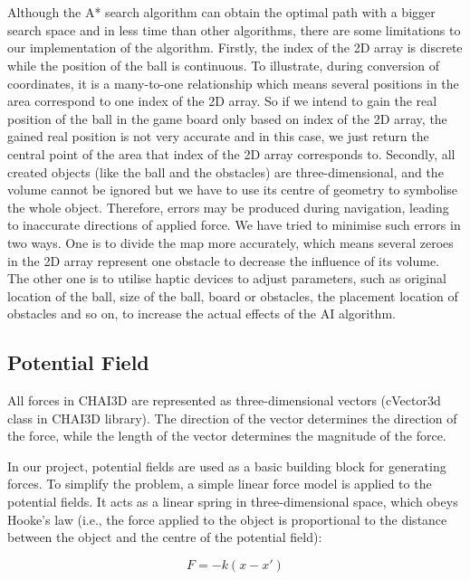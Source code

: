 \documentclass[a4paper]{article}
\begin{document}
 \\ \\
Although the A* search algorithm can obtain the optimal path with a bigger search space and in less time than other algorithms, there are some limitations to our implementation of the algorithm. Firstly, the index of the 2D array is discrete while the position of the ball is continuous. To illustrate, during conversion of coordinates, it is a many-to-one relationship which means several positions in the area correspond to one index of the 2D array. So if we intend to gain the real position of the ball in the game board only based on index of the 2D array, the gained real position is not very accurate and in this case, we just return the central point of the area that index of the 2D array corresponds to. Secondly, all created objects (like the ball and the obstacles) are three-dimensional, and the volume cannot be ignored but we have to use its centre of geometry to symbolise the whole object. Therefore, errors may be produced during navigation, leading to inaccurate directions of applied force. We have tried to minimise such errors in two ways. One is to divide the map more accurately, which means several zeroes in the 2D array represent one obstacle to decrease the influence of its volume. The other one is to utilise haptic devices to adjust parameters, such as original location of the ball, size of the ball, board or obstacles, the placement location of obstacles and so on, to increase the actual effects of the AI algorithm.

\subsection{Potential Field}
All forces in CHAI3D are represented as three-dimensional vectors (cVector3d class in CHAI3D library). The direction of the vector determines the direction of the force, while the length of the vector determines the magnitude of the force.

In our project, potential fields are used as a basic building block for generating forces. To simplify the problem, a simple linear force model is applied to the potential fields. It acts as a linear spring in three-dimensional space, which obeys Hooke’s law (i.e., the force applied to the object is proportional to the distance between the object and the centre of the potential field):

\begin{center}
\begin{equation}
F = -k (x - x')
\end{equation}
\end{center}
\end{document}
